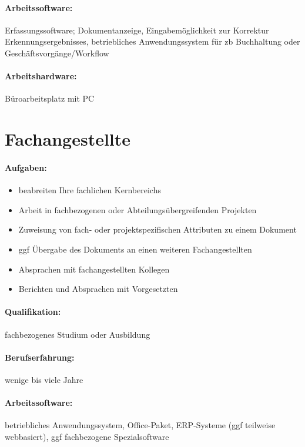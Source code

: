 \documentclass[11pt,oneside,a4paper,notitlepage]{article}
\begin{document}
\paragraph*{Arbeitssoftware: } Erfassungssoftware; Dokumentanzeige, Eingabemöglichkeit zur Korrektur Erkennungsergebnisses, 
betriebliches Anwendungssystem für zb Buchhaltung oder Geschäftsvorgänge/Workflow

%
\paragraph*{Arbeitshardware: } Büroarbeitsplatz mit PC

%
%
\section{Fachangestellte}

\paragraph*{Aufgaben: }
\begin{itemize}
\item beabreiten Ihre fachlichen Kernbereichs
\item Arbeit in fachbezogenen oder Abteilungsübergreifenden Projekten
\item Zuweisung von fach- oder projektspezifischen Attributen zu einem Dokument
\item ggf Übergabe des Dokuments an einen weiteren Fachangestellten
\item Absprachen mit fachangestellten Kollegen
\item Berichten und Absprachen mit Vorgesetzten
\end{itemize}
\noindent

\paragraph*{Qualifikation: } fachbezogenes Studium oder Ausbildung

%
\paragraph*{Berufserfahrung: } wenige bis viele Jahre

%
\paragraph*{Arbeitssoftware: } betriebliches Anwendungssystem, Office-Paket, ERP-Systeme (ggf teilweise webbasiert), ggf fachbezogene Spezialsoftware
%
\end{document}

